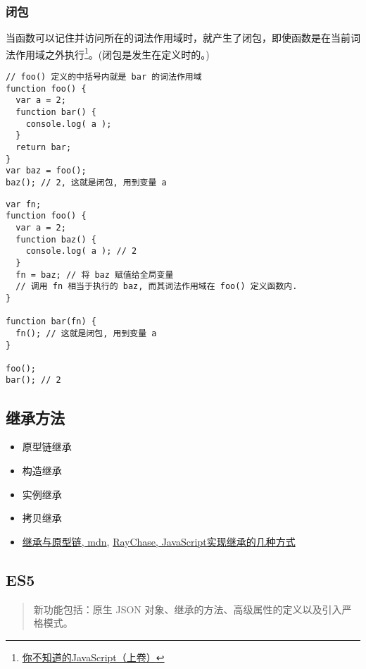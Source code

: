\subsubsection{闭包}\label{ux95edux5305}

当函数可以记住并访问所在的词法作用域时，就产生了闭包，即使函数是在当前词法作用域之外执行\footnote{\href{http://book.douban.com/subject/26351021/}{你不知道的JavaScript（上卷）}}。(闭包是发生在定义时的。)

\begin{lstlisting}
// foo() 定义的中括号内就是 bar 的词法作用域
function foo() {
  var a = 2;
  function bar() {
    console.log( a );
  }
  return bar;
}
var baz = foo();
baz(); // 2, 这就是闭包, 用到变量 a
\end{lstlisting}

\begin{lstlisting}
var fn;
function foo() {
  var a = 2;
  function baz() {
    console.log( a ); // 2
  }
  fn = baz; // 将 baz 赋值给全局变量
  // 调用 fn 相当于执行的 baz, 而其词法作用域在 foo() 定义函数内.
}

function bar(fn) {
  fn(); // 这就是闭包, 用到变量 a
}

foo();
bar(); // 2
\end{lstlisting}

\subsection{继承方法}\label{ux7ee7ux627fux65b9ux6cd5}

\begin{itemize}
\item
  原型链继承
\item
  构造继承
\item
  实例继承
\item
  拷贝继承
\item
  \href{https://developer.mozilla.org/zh-CN/docs/Web/JavaScript/Inheritance_and_the_prototype_chain}{继承与原型链,
  mdn}, \href{http://raychase.iteye.com/blog/1337415}{RayChase,
  JavaScript实现继承的几种方式}
\end{itemize}

\subsection{ES5}\label{es5}

\begin{quote}
新功能包括：原生 JSON 对象、继承的方法、高级属性的定义以及引入严格模式。
\end{quote}

